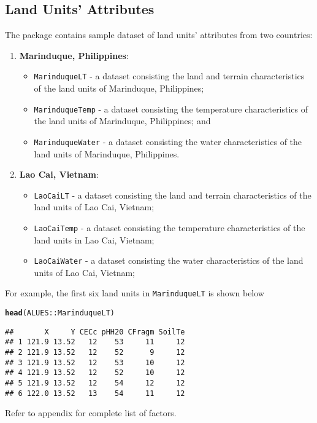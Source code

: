 \documentclass[11pt,fleqn]{article}\usepackage[]{graphicx}\usepackage[]{color}
\makeatletter
\newcommand{\hlstd}[1]{\textcolor[rgb]{0.345,0.345,0.345}{#1}}%
\newcommand{\hlkwd}[1]{\textcolor[rgb]{0.737,0.353,0.396}{\textbf{#1}}}%
\newenvironment{kframe}{%
 \def\at@end@of@kframe{}%
 \ifinner\ifhmode%
  \def\at@end@of@kframe{\end{minipage}}%
  \begin{minipage}{\columnwidth}%
 \fi\fi%
 \def\FrameCommand##1{\hskip\@totalleftmargin \hskip-\fboxsep
 \colorbox{shadecolor}{##1}\hskip-\fboxsep
     \hskip-\linewidth \hskip-\@totalleftmargin \hskip\columnwidth}%
 \MakeFramed {\advance\hsize-\width
   \@totalleftmargin\z@ \linewidth\hsize
   \@setminipage}}%
 {\par\unskip\endMakeFramed%
 \at@end@of@kframe}
\newenvironment{knitrout}{}{} %
\makeatother
\begin{document}
\subsection{Land Units' Attributes}
The package contains sample dataset of land units' attributes from two countries:
\begin{enumerate}
\item \textbf{Marinduque, Philippines}:
\begin{itemize}
\item \verb|MarinduqueLT| - a dataset consisting the land and terrain characteristics of the land units of Marinduque, Philippines;
\item \verb|MarinduqueTemp| - a dataset consisting the temperature characteristics of the land units of Marinduque, Philippines; and
\item \verb|MarinduqueWater| - a dataset consisting the water characteristics of the land units of Marinduque, Philippines.
\end{itemize}
\item \textbf{Lao Cai, Vietnam}:
\begin{itemize}
\item \verb|LaoCaiLT| - a dataset consisting the land and terrain characteristics of the land units of Lao Cai, Vietnam;
\item \verb|LaoCaiTemp| - a dataset consisting the temperature characteristics of the land units in Lao Cai, Vietnam;
\item \verb|LaoCaiWater| - a dataset consisting the water characteristics of the land units of Lao Cai, Vietnam;
\end{itemize}
\end{enumerate}

\noindent For example, the first six land units in \verb|MarinduqueLT| is shown below
\begin{knitrout}
\color{fgcolor}\begin{kframe}
\begin{alltt}
\hlkwd{head}\hlstd{(ALUES::MarinduqueLT)}
\end{alltt}
\begin{verbatim}
##       X     Y CECc pHH20 CFragm SoilTe
## 1 121.9 13.52   12    53     11     12
## 2 121.9 13.52   12    52      9     12
## 3 121.9 13.52   12    53     10     12
## 4 121.9 13.52   12    52     10     12
## 5 121.9 13.52   12    54     12     12
## 6 122.0 13.52   13    54     11     12
\end{verbatim}
\end{kframe}
\end{knitrout}
\noindent Refer to appendix for complete list of factors.
\end{document}
